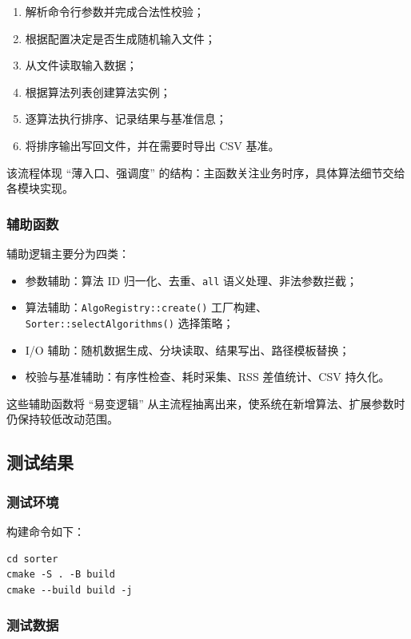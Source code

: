\documentclass[12pt, a4paper]{ctexart}
\begin{document}
\begin{enumerate}
    \item 解析命令行参数并完成合法性校验；
    \item 根据配置决定是否生成随机输入文件；
    \item 从文件读取输入数据；
    \item 根据算法列表创建算法实例；
    \item 逐算法执行排序、记录结果与基准信息；
    \item 将排序输出写回文件，并在需要时导出 CSV 基准。
\end{enumerate}

该流程体现 ``薄入口、强调度'' 的结构：主函数关注业务时序，具体算法细节交给各模块实现。

\subsubsection{辅助函数}

辅助逻辑主要分为四类：

\begin{itemize}
    \item 参数辅助：算法 ID 归一化、去重、\texttt{all} 语义处理、非法参数拦截；
    \item 算法辅助：\texttt{AlgoRegistry::create()} 工厂构建、\texttt{Sorter::selectAlgorithms()} 选择策略；
    \item I/O 辅助：随机数据生成、分块读取、结果写出、路径模板替换；
    \item 校验与基准辅助：有序性检查、耗时采集、RSS 差值统计、CSV 持久化。
\end{itemize}

这些辅助函数将 ``易变逻辑'' 从主流程抽离出来，使系统在新增算法、扩展参数时仍保持较低改动范围。

\subsection{测试结果}

\subsubsection{测试环境}

构建命令如下：

\begin{verbatim}
cd sorter
cmake -S . -B build
cmake --build build -j
\end{verbatim}

\subsubsection{测试数据}
\end{document}
